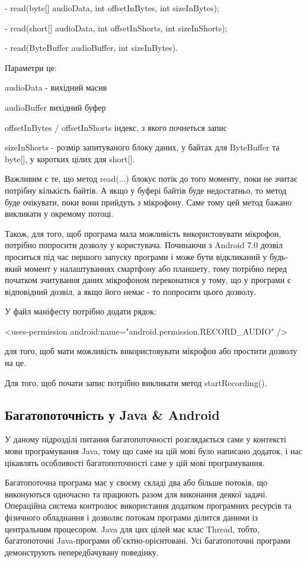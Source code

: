 - read(byte[] audioData, int offsetInBytes, int sizeInBytes);

- read(short[] audioData, int offsetInShorts, int sizeInShorts);

- read(ByteBuffer audioBuffer, int sizeInBytes).

Параметри це:

audioData - вихідний масив

audioBuffer	вихідний буфер

offsetInBytes / offsetInShorts	індекс, з якого почнеться запис

sizeInShorts - розмір запитуваного блоку даних, у байтах для ByteBuffer та byte[], у коротких цілих для short[].

Важливим є те, що метод read(...) блокує потік до того моменту, поки не зчитає потрібну кількість байтів. А якщо у буфері байтів буде недостатньо, то метод буде очікувати, поки вони прийдуть з мікрофону. Саме тому цей метод бажано викликати у окремому потоці.

Також, для того, щоб програма мала можливість використовувати мікрофон, потрібно попросити дозволу у користувача. Починаючи з Android 7.0 дозвіл проситься під час першого запуску програми і може бути відкликаний у будь-який момент у налаштуваннях смартфону або планшету, тому потрібно перед початком зчитування даних мікрофоном переконатися у тому, що у програми є відповідний дозвіл, а якщо його немає - то попросити цього дозволу.

У файл маніфесту потрібно додати рядок:

<uses-permission android:name="android.permission.RECORD\_AUDIO" />

для того, щоб мати можливість використовувати мікрофон або простити дозволу на це.

Для того, щоб почати запис потрібно викликати метод startRecording().

\subsection{Багатопоточність у Java \& Android}

У даному підрозділі питання багатопоточності розглядається саме у контексті мови програмування Java, тому що саме на цій мові було написано додаток, і нас цікавлять особливості багатопоточності саме у цій мові програмування.

Багатопоточна програма має у своєму складі два або більше потоків, що виконуються одночасно та працюють разом для виконання деякої задачі. Операційна система контролює використання додатком програмних ресурсів та фізичного обладнання і дозволяє потокам програми ділится даними із центральним процесором. Java для цих цілей має клас Thread, тобто, багатопоточні Java-програми об'єктно-орієнтовані. Усі багатопоточні програми демонструють непередбачувану поведінку.

